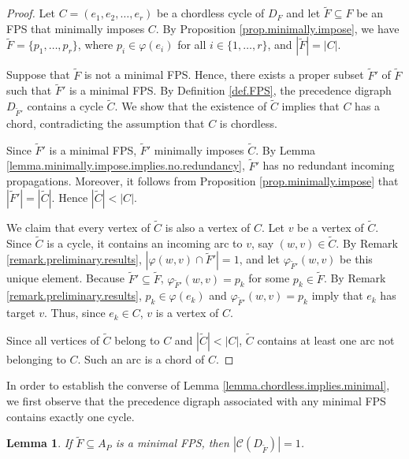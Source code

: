 \documentclass{article}
\newcommand{\CC}{{\mathscr C}}
\newtheorem{lemma}{Lemma}
\begin{document}
\begin{proof}
Let $C = (e_1, e_2, \dots, e_r)$ be a  chordless cycle of $D_F$ and let $\tilde F \subseteq F$ be an FPS that minimally imposes $C$.
By Proposition \ref{prop.minimally.impose}, we have $\tilde F = \{p_1,\ldots,p_r\}$, where $p_i \in \varphi(e_i)$ for all $i \in \{1,\ldots,r\}$, and $|\tilde F| = |C|$.

Suppose that $\tilde F$ is not a minimal FPS.
Hence, there exists a proper subset $\tilde F'$ of $\tilde F$ such that $\tilde F'$ is a minimal FPS.
By Definition \ref{def.FPS}, the precedence digraph $D_{\tilde F'}$ contains a cycle $\tilde C$.
We show that the existence of $\tilde C$ implies that $C$ has a chord, contradicting the assumption that $C$ is chordless.

Since $\tilde F'$ is a minimal FPS, $\tilde F'$ minimally imposes $\tilde C$.
By Lemma \ref{lemma.minimally.impose.implies.no.redundancy}, $\tilde F'$ has no redundant incoming propagations.
Moreover, it follows from Proposition \ref{prop.minimally.impose} that $|\tilde F'| = |\tilde C|$. Hence $|\tilde C| < |C|$.

We claim that every vertex of $\tilde C$ is also a vertex of $C$.
Let $v$ be a vertex of $\tilde C$.
Since $\tilde C$ is a  cycle, it contains an incoming arc to $v$, say $(w, v) \in \tilde C$.
By Remark \ref{remark.preliminary.results}, $|\varphi(w, v) \cap \tilde F'| = 1$, and let $\varphi_{\tilde F'}(w,v)$ be this unique element.
Because $\tilde F' \subseteq \tilde F$, $\varphi_{\tilde F'}(w, v) = p_k$ for some $p_k \in \tilde F$.
By Remark \ref{remark.preliminary.results}, $p_k \in \varphi(e_k)$ and $\varphi_{\tilde F'}(w, v) = p_k$ imply that $e_k$ has target $v$.
Thus, since $e_k \in C$, $v$ is a vertex of $C$.

Since all vertices of $\tilde C$ belong to $C$ and $|\tilde C| < |C|$, $\tilde C$ contains at least one arc not belonging to $C$. Such an arc is a chord of $C$. 
\end{proof}

In order to establish the converse of Lemma \ref{lemma.chordless.implies.minimal}, we first observe that the precedence digraph associated with any minimal FPS contains exactly one cycle. 

\begin{lemma}\label{lemma.minimal.implies.exactly.one.cycle}
If $\tilde F \subseteq A_P$ is a minimal FPS, then $|\CC(D_{\tilde F})| = 1$.
\end{lemma}
\end{document}
